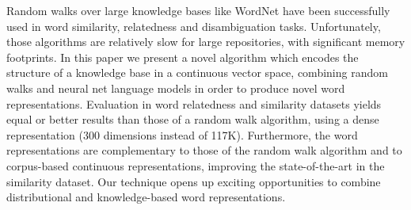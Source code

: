 Random walks over large knowledge bases like WordNet have been successfully used in word similarity, relatedness and disambiguation tasks. Unfortunately, those algorithms are relatively slow for large repositories, with significant memory footprints. In this paper we present a novel algorithm which encodes the structure of a knowledge base in a continuous vector space, combining random walks and neural net language models in order to produce novel word representations. Evaluation in word relatedness and similarity datasets yields equal or better results than those of a random walk algorithm, using a dense representation (300 dimensions instead of 117K). Furthermore, the word representations are complementary to those of the random walk algorithm and to corpus-based continuous representations, improving the state-of-the-art in the similarity dataset. Our technique opens up exciting opportunities to combine distributional and knowledge-based word representations.
